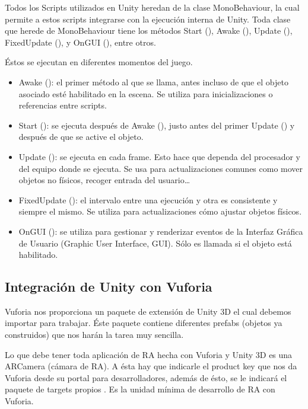 Todos los Scripts utilizados en Unity heredan de la clase MonoBehaviour, la cual permite a estos scripts integrarse con la ejecución interna de Unity. Toda clase que herede de MonoBehaviour tiene los métodos Start (), Awake (), Update (), FixedUpdate (), y OnGUI (), entre otros. 

Éstos se ejecutan en diferentes momentos del juego.

\begin{itemize}
\item{Awake (): el primer método al que se llama, antes incluso de que el objeto asociado esté habilitado en la escena. Se utiliza para inicializaciones o referencias entre scripts.}

\item{Start (): se ejecuta después de Awake (), justo antes del primer Update () y después de que se active el objeto.}

\item{Update (): se ejecuta en cada frame. Esto hace que dependa del procesador y del equipo donde se ejecuta. Se usa para actualizaciones comunes como mover objetos no físicos, recoger entrada del usuario\ldots{}}

\item{FixedUpdate (): el intervalo entre una ejecución y otra es consistente y siempre el mismo. Se utiliza para actualizaciones cómo ajustar objetos físicos.}

\item{OnGUI (): se utiliza para gestionar y renderizar eventos de la Interfaz Gráfica de Usuario (Graphic User Interface, GUI). Sólo es llamada si el objeto está habilitado.}
\end{itemize}

\subsection{Integración de Unity con Vuforia}
\label{cap4:sub:unityvuforia}

Vuforia nos proporciona un paquete de extensión de Unity 3D el cual debemos importar para trabajar. Éste paquete contiene diferentes prefabs (objetos ya construidos) que nos harán la tarea muy sencilla.

Lo que debe tener toda aplicación de RA hecha con Vuforia y Unity 3D es una ARCamera (cámara de RA). A ésta hay que indicarle el product key que nos da Vuforia desde su portal para desarrolladores, además de ésto, se le indicará el paquete de targets propios . Es la unidad mínima de desarrollo de RA con Vuforia.

